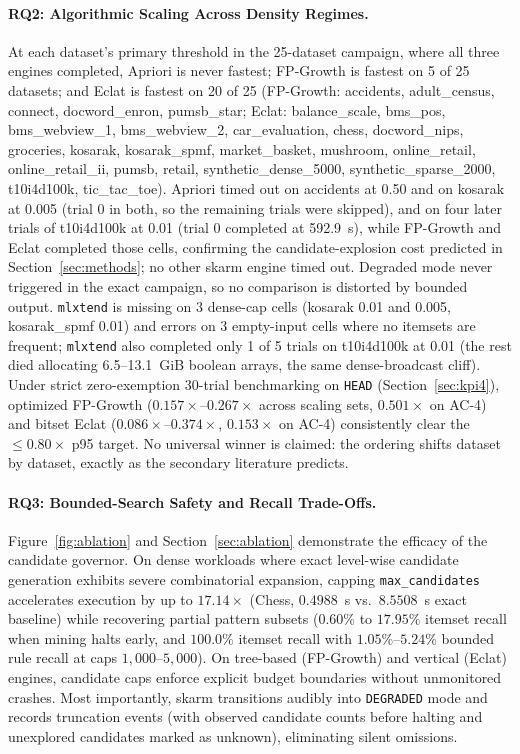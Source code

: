 \documentclass[journal,a4paper]{IEEEtran}
\newcommand{\skarm}{skarm\xspace}
\begin{document}
\paragraph{RQ2: Algorithmic Scaling Across Density Regimes.}
At each dataset's primary threshold in the 25-dataset campaign, where all three engines completed, Apriori is never fastest; FP-Growth is fastest on 5 of 25 datasets; and Eclat is fastest on 20 of 25 (FP-Growth: accidents, adult\_census, connect, docword\_enron, pumsb\_star; Eclat: balance\_scale, bms\_pos, bms\_webview\_1, bms\_webview\_2, car\_evaluation, chess, docword\_nips, groceries, kosarak, kosarak\_spmf, market\_basket, mushroom, online\_retail, online\_retail\_ii, pumsb, retail, synthetic\_dense\_5000, synthetic\_sparse\_2000, t10i4d100k, tic\_tac\_toe). Apriori timed out on accidents at 0.50 and on kosarak at 0.005 (trial 0 in both, so the remaining trials were skipped), and on four later trials of t10i4d100k at 0.01 (trial 0 completed at 592.9~s), while FP-Growth and Eclat completed those cells, confirming the candidate-explosion cost predicted in Section~\ref{sec:methods}; no other \skarm engine timed out. Degraded mode never triggered in the exact campaign, so no comparison is distorted by bounded output. \texttt{mlxtend} is missing on 3 dense-cap cells (kosarak 0.01 and 0.005, kosarak\_spmf 0.01) and errors on 3 empty-input cells where no itemsets are frequent; \texttt{mlxtend} also completed only 1 of 5 trials on t10i4d100k at 0.01 (the rest died allocating 6.5--13.1~GiB boolean arrays, the same dense-broadcast cliff). Under strict zero-exemption 30-trial benchmarking on \texttt{HEAD} (Section~\ref{sec:kpi4}), optimized FP-Growth ($0.157\times$--$0.267\times$ across scaling sets, $0.501\times$ on AC-4) and bitset Eclat ($0.086\times$--$0.374\times$, $0.153\times$ on AC-4) consistently clear the $\le 0.80\times$ p95 target. No universal winner is claimed: the ordering shifts dataset by dataset, exactly as the secondary literature predicts.

\paragraph{RQ3: Bounded-Search Safety and Recall Trade-Offs.} Figure~\ref{fig:ablation} and Section~\ref{sec:ablation} demonstrate the efficacy of the candidate governor. On dense workloads where exact level-wise candidate generation exhibits severe combinatorial expansion, capping \texttt{max\_candidates} accelerates execution by up to $17.14\times$ (Chess, $0.4988$~s vs.\ $8.5508$~s exact baseline) while recovering partial pattern subsets ($0.60\%$ to $17.95\%$ itemset recall when mining halts early, and $100.0\%$ itemset recall with $1.05\%$--$5.24\%$ bounded rule recall at caps $1{,}000$--$5{,}000$). On tree-based (FP-Growth) and vertical (Eclat) engines, candidate caps enforce explicit budget boundaries without unmonitored crashes. Most importantly, \skarm transitions audibly into \texttt{DEGRADED} mode and records truncation events (with observed candidate counts before halting and unexplored candidates marked as unknown), eliminating silent omissions.
\end{document}
